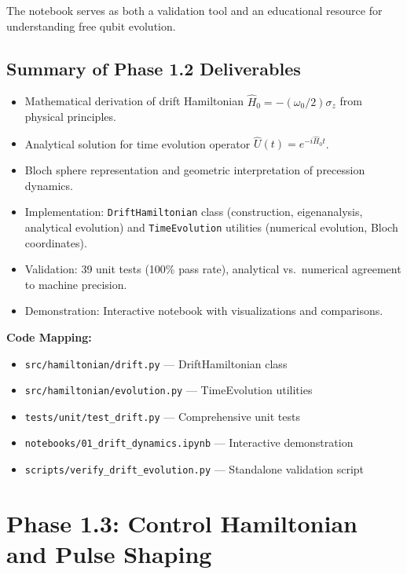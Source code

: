 \documentclass[11pt,a4paper]{article}
\theoremstyle{definition}
\theoremstyle{remark}
\begin{document}
The notebook serves as both a validation tool and an educational resource for understanding free qubit evolution.

\subsection{Summary of Phase 1.2 Deliverables}

\begin{itemize}
    \item Mathematical derivation of drift Hamiltonian $\hat{H}_0 = -(\omega_0/2) \sigma_z$ from physical principles.
    \item Analytical solution for time evolution operator $\hat{U}(t) = e^{-i\hat{H}_0 t}$.
    \item Bloch sphere representation and geometric interpretation of precession dynamics.
    \item Implementation: \texttt{DriftHamiltonian} class (construction, eigenanalysis, analytical evolution) and \texttt{TimeEvolution} utilities (numerical evolution, Bloch coordinates).
    \item Validation: 39 unit tests (100\% pass rate), analytical vs.\ numerical agreement to machine precision.
    \item Demonstration: Interactive notebook with visualizations and comparisons.
\end{itemize}

\textbf{Code Mapping:}
\begin{itemize}
    \item \texttt{src/hamiltonian/drift.py} — DriftHamiltonian class
    \item \texttt{src/hamiltonian/evolution.py} — TimeEvolution utilities
    \item \texttt{tests/unit/test\_drift.py} — Comprehensive unit tests
    \item \texttt{notebooks/01\_drift\_dynamics.ipynb} — Interactive demonstration
    \item \texttt{scripts/verify\_drift\_evolution.py} — Standalone validation script
\end{itemize}

\section{Phase 1.3: Control Hamiltonian and Pulse Shaping}
\label{sec:phase1.3}
\end{document}
